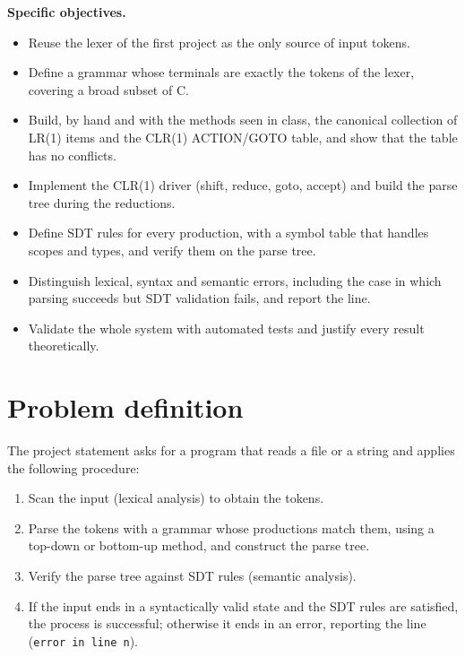 \documentclass[11pt,letterpaper]{article}
\let\oldsection\section
\renewcommand{\section}{\needspace{8\baselineskip}\oldsection}
\begin{document}
\textbf{Specific objectives.}
\begin{itemize}
  \item Reuse the lexer of the first project as the only source of input
        tokens.
  \item Define a grammar whose terminals are exactly the tokens of the lexer,
        covering a broad subset of C.
  \item Build, by hand and with the methods seen in class, the canonical
        collection of LR(1) items and the CLR(1) ACTION/GOTO table, and show
        that the table has no conflicts.
  \item Implement the CLR(1) driver (shift, reduce, goto, accept) and build
        the parse tree during the reductions.
  \item Define SDT rules for every production, with a symbol table that
        handles scopes and types, and verify them on the parse tree.
  \item Distinguish lexical, syntax and semantic errors, including the case in
        which parsing succeeds but SDT validation fails, and report the line.
  \item Validate the whole system with automated tests and justify every
        result theoretically.
\end{itemize}

\section{Problem definition}

The project statement \cite{parserpdf} asks for a program that reads a file or
a string and applies the following procedure:

\begin{enumerate}
  \item Scan the input (lexical analysis) to obtain the tokens.
  \item Parse the tokens with a grammar whose productions match them, using a
        top-down or bottom-up method, and construct the parse tree.
  \item Verify the parse tree against SDT rules (semantic analysis).
  \item If the input ends in a syntactically valid state and the SDT rules
        are satisfied, the process is successful; otherwise it ends in an
        error, reporting the line (\texttt{error in line n}).
\end{enumerate}
\end{document}
